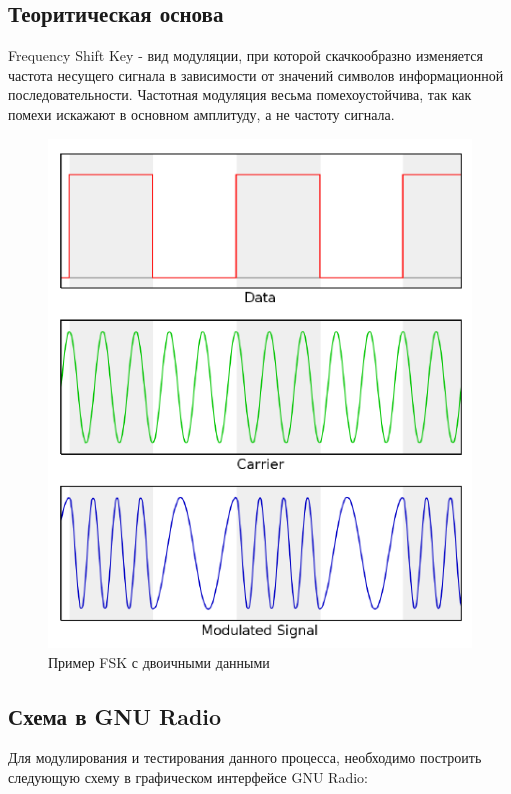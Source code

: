 \subsection{Теоритическая основа}

\qquad Frequency Shift Key - вид модуляции, при которой скачкообразно изменяется частота несущего сигнала в зависимости от значений символов информационной последовательности. Частотная модуляция весьма помехоустойчива, так как помехи искажают в основном амплитуду, а не частоту сигнала.

\begin{figure}[H]
	\begin{center}
		\includegraphics[scale=1]{fig/lab12/lab12_01.png}
		\caption{Пример FSK с двоичными данными}
	\end{center}
\end{figure}

\subsection{Схема в GNU Radio}    
    Для модулирования и тестирования данного процесса, необходимо построить следующую схему в графическом интерфейсе GNU Radio:
    
